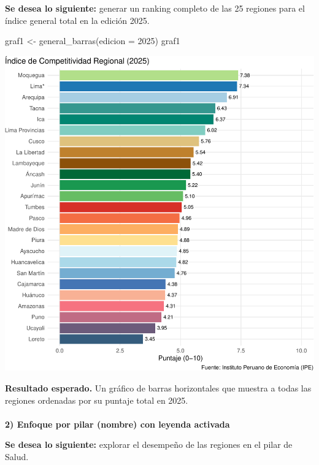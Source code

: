 \documentclass[
  11pt,
  letterpaper,
  DIV=11,
  numbers=noendperiod]{scrartcl}
\makeatletter
\let\oldparagraph\paragraph
\renewcommand{\paragraph}{
    \@ifstar
      \xxxParagraphStar
      \xxxParagraphNoStar
  }
\newcommand{\xxxParagraphStar}[1]{\oldparagraph*{#1}\mbox{}}
\newcommand{\xxxParagraphNoStar}[1]{\oldparagraph{#1}\mbox{}}
\newenvironment{Shaded}{\begin{snugshade}}{\end{snugshade}}
\newcommand{\AttributeTok}[1]{\textcolor[rgb]{0.40,0.45,0.13}{#1}}
\newcommand{\DecValTok}[1]{\textcolor[rgb]{0.68,0.00,0.00}{#1}}
\newcommand{\FunctionTok}[1]{\textcolor[rgb]{0.28,0.35,0.67}{#1}}
\newcommand{\NormalTok}[1]{\textcolor[rgb]{0.00,0.23,0.31}{#1}}
\newcommand{\OtherTok}[1]{\textcolor[rgb]{0.00,0.23,0.31}{#1}}
\makeatother
\begin{document}
\textbf{Se desea lo siguiente:} generar un ranking completo de las 25
regiones para el índice general total en la edición 2025.

\begin{Shaded}
\begin{Highlighting}[]
\NormalTok{graf1 }\OtherTok{\textless{}{-}} \FunctionTok{general\_barras}\NormalTok{(}\AttributeTok{edicion =} \DecValTok{2025}\NormalTok{)}
\NormalTok{graf1}
\end{Highlighting}
\end{Shaded}

\includegraphics{Manual_files/figure-pdf/unnamed-chunk-16-1.pdf}

\textbf{Resultado esperado.} Un gráfico de barras horizontales que
muestra a todas las regiones ordenadas por su puntaje total en 2025.

\paragraph{\texorpdfstring{\textbf{2) Enfoque por pilar (nombre) con
leyenda
activada}}{2) Enfoque por pilar (nombre) con leyenda activada}}\label{enfoque-por-pilar-nombre-con-leyenda-activada}

\textbf{Se desea lo siguiente:} explorar el desempeño de las regiones en
el pilar de Salud.
\end{document}
